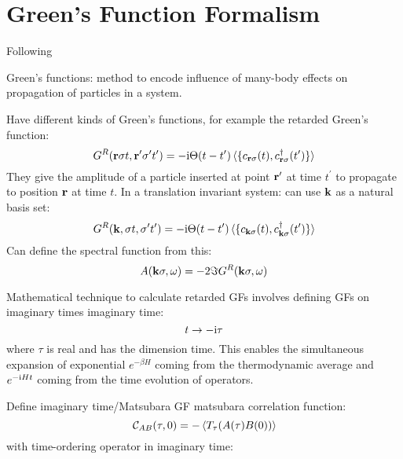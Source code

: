 \chapter{Green's Function Formalism}\label{ch:green's-function-formalism}

Following~\cite{Bruus_Flensberg_2004}

Green's functions: method to encode influence of many-body effects on propagation of particles in a system.

Have different kinds of Green's functions, for example the retarded Green's function:
\begin{equation}
    G^R (\bm{\mathrm{r}}\sigma t, \bm{\mathrm{r}}^{\prime} \sigma^{\prime} t^{\prime}) = -\mathrm{i} \Theta(t- t^{\prime}) \braket{ \{c_{\bm{\mathrm{r}} \sigma} (t), c_{\bm{\mathrm{r}} \sigma}^{\dagger} (t^{\prime})\}}
\end{equation}
They give the amplitude of a particle inserted at point \(\bm{\mathrm{r}}^{\prime}\) at time \(t^{\prime}\) to propagate to position \(\bm{\mathrm{r}}\) at time \(t\).
In a translation invariant system: can use \(\bm{\mathrm{k}}\) as a natural basis set:
\begin{equation}
    G^R (\bm{\mathrm{k}}, \sigma t, \sigma^{\prime} t^{\prime}) = -\mathrm{i} \Theta(t- t^{\prime}) \braket{ \{c_{\bm{\mathrm{k}} \sigma} (t), c_{\bm{\mathrm{k}} \sigma}^{\dagger} (t^{\prime})\}}
\end{equation}
Can define the spectral function from this:
\begin{equation}
    A(\bm{\mathrm{k}} \sigma, \omega) = -2 \Im G^R (\bm{\mathrm{k}} \sigma, \omega)
\end{equation}


Mathematical technique to calculate retarded GFs involves defining GFs on imaginary times \gls{imaginary time}:
\begin{equation}
    t \to -\mathrm{i} \tau
\end{equation}
where \(\tau\) is real and has the dimension time.
This enables the simultaneous expansion of exponential \(e^{-\beta H}\) coming from the thermodynamic average and \(e^{-\mathrm{i} H t}\) coming from the time evolution of operators.


Define imaginary time/Matsubara GF \gls{matsubara correlation function}:
\begin{equation}
    \mathcal{C}_{A B} (\tau, 0) = - \Braket{T_{\tau} (A(\tau) B(0))}
\end{equation}
with time-ordering operator in imaginary time: 

